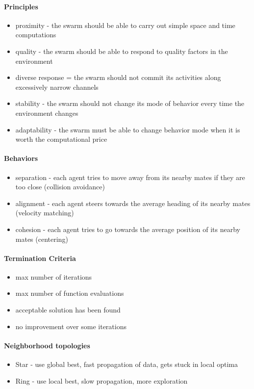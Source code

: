 \documentclass[12pt]{article}
\begin{document}
\paragraph{Principles} 
\label{par:principles}
\begin{itemize}
	\item proximity - the swarm should be able to carry out simple space and time computations
	\item quality - the swarm should be able to respond to quality factors in the environment
	\item diverse response = the swarm should not commit its activities along excessively narrow channels
	\item stability - the swarm should not change its mode of behavior every time the environment changes
	\item adaptability - the swarm must be able to change behavior mode when it is worth the computational price
\end{itemize}

\paragraph{Behaviors} 
\label{par:behaviors}
\begin{itemize}
	\item separation - each agent tries to move away from its nearby mates if they are too close (collision avoidance)
	\item alignment - each agent steers towards the average heading of its nearby mates (velocity matching)
	\item cohesion - each agent tries to go towards the average position of its nearby mates (centering)
\end{itemize}

\paragraph{Termination Criteria} 
\label{par:termination_criteria}
\begin{itemize}
	\item max number of iterations
	\item max number of function evaluations
	\item acceptable solution has been found
	\item no improvement over some iterations
\end{itemize}

\paragraph{Neighborhood topologies} 
\label{par:neighborhood_topologies}
\begin{itemize}
	\item Star - use global best, fast propagation of data, gets stuck in local optima
	\item Ring - use local best, slow propagation, more exploration
\end{itemize}
\end{document}
